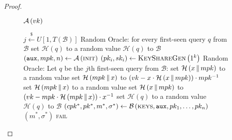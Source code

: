 \begin{proof}
      \begin{figure}[!htbp]
        \begin{algobox}{$\mathcal{A}\left(vk\right)$}
          \begin{algorithmic}[1]
            \State $j \overset{\$}{\gets} U\left[1,
            T\left(\mathcal{B}\right)\right]$
            \Indent
              \State Random Oracle: for every first-seen query $q$ from
              $\mathcal{B}$ set $\mathcal{H}\left(q\right)$ to a random value
              \State \Return $\mathcal{H}\left(q\right)$ to $\mathcal{B}$
            \EndIndent
            \State $\left(\mathtt{aux}, mpk, n\right) \gets
            \mathcal{A}\left(\textsc{init}\right)$
              \State $\left(pk_i, sk_i\right) \gets
              \textsc{KeyShareGen}\left(1^k\right)$
            \EndFor
            \Indent
              \State Random Oracle: Let $q$ be the $j$th first-seen query from
              $\mathcal{B}$:
              \label{proof:comb:share:ro:start}
                  \State set $\mathcal{H}\left(x \,\|\, mpk\right)$ to a random
                  value
                \EndIf
                \State set $\mathcal{H}\left(mpk \,\|\, x\right)$ to $\left(vk
                - x \cdot \mathcal{H}\left(x \,\|\, mpk\right)\right) \cdot
                mpk^{-1}$
                  \State set $\mathcal{H}\left(mpk \,\|\, x\right)$ to a random
                  value
                \EndIf
                \State set $\mathcal{H}\left(x \,\|\, mpk\right)$ to $\left(vk
                - mpk \cdot \mathcal{H}\left(mpk \,\|\, x\right)\right) \cdot
                x^{-1}$
                \label{proof:comb:share:ro:end}
              \Else
                \State set $\mathcal{H}\left(q\right)$ to a random value
              \EndIf
              \State \Return $\mathcal{H}\left(q\right)$ to $\mathcal{B}$
            \EndIndent
            \State $\left(cpk^*, pk^*, m^*, \sigma^*\right) \gets
            \mathcal{B}\left(\textsc{keys}, \mathtt{aux}, pk_1, \dots,
            pk_n\right)$
             
            \label{proof:comb:share:distinguisher:won}
              \State \Return $\left(m^*, \sigma^*\right)$
            \Else
              \State \Return \textsc{fail}
            \EndIf
          \end{algorithmic}
        \end{algobox}
        \caption{}
        \label{proof:comb:share:distinguisher}
      \end{figure}


\end{proof}

